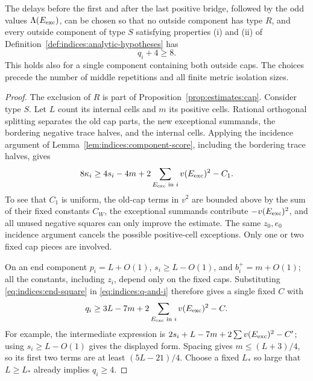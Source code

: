 \begin{lemma}\label{lem:indices:end-exclusion}
The delays before the first and after the last positive bridge, followed
by the odd values $\Lambda(E_{\rm exc})$, can be chosen so that no outside
component has type $R$, and every outside component of type $S$ satisfying
properties (i) and (ii) of
Definition~\ref{def:indices:analytic-hypotheses} has
\begin{equation}\label{eq:indices:end-score}
 q_i+4\ge8.
\end{equation}
This holds also for a single component containing both outside caps.
The choices precede the number of middle repetitions and all finite
metric isolation sizes.
\end{lemma}
\begin{proof}
The exclusion of $R$ is part of Proposition~\ref{prop:estimates:cap}.
Consider type $S$.  Let $L$ count its internal cells and $m$ its positive
cells.  Rational orthogonal splitting separates the old cap parts, the
new exceptional summands, the bordering negative trace halves, and the
internal cells.  Applying the incidence argument of
Lemma~\ref{lem:indices:component-score}, including the bordering trace
halves, gives
\begin{equation}\label{eq:indices:end-square}
 8\kappa_i\ge4s_i-4m
       +2\sum_{E_{\rm exc}\text{ in }i}v(E_{\rm exc})^2-C_1.
\end{equation}
To see that $C_1$ is uniform, the old-cap terms in $v^2$ are bounded above
by the sum of their fixed constants $C_W$, the exceptional summands
contribute $-v(E_{\rm exc})^2$, and all unused negative squares can only
improve the estimate.  The same $z_0,e_0$ incidence argument cancels the
possible positive-cell exceptions.  Only one or two fixed cap pieces
are involved.

On an end component $p_i=L+O(1)$, $s_i\ge L-O(1)$, and
$b_i^+=m+O(1)$; all the constants, including $z_i$, depend only on the
fixed caps.  Substituting \eqref{eq:indices:end-square} in
\eqref{eq:indices:q-and-i} therefore gives a single fixed $C$ with
\begin{equation}\label{eq:indices:end-lower}
 q_i\ge3L-7m
       +2\sum_{E_{\rm exc}\text{ in }i}v(E_{\rm exc})^2-C.
\end{equation}
For example, the intermediate expression is
$2s_i+L-7m+2\sum v(E_{\rm exc})^2-C'$; using $s_i\ge L-O(1)$
gives the displayed form.  Spacing gives $m\le(L+3)/4$, so its first two
terms are at least $(5L-21)/4$.  Choose a fixed $L_*$ so large that
$L\ge L_*$ already implies $q_i\ge4$.


\end{proof}
